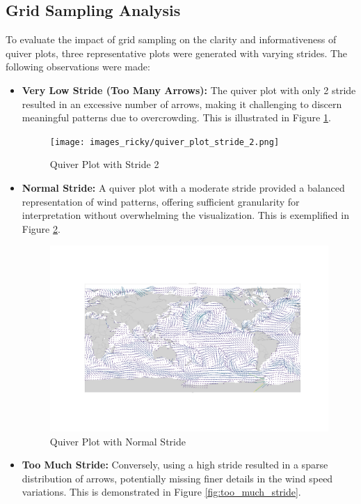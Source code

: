 \documentclass[conference]{IEEEtran}
\begin{document}
\subsection{Grid Sampling Analysis}

To evaluate the impact of grid sampling on the clarity and informativeness of quiver plots, three representative plots were generated with varying strides. The following observations were made:

\begin{itemize}
  \item \textbf{Very Low Stride (Too Many Arrows):} The quiver plot with only 2 stride resulted in an excessive number of arrows, making it challenging to discern meaningful patterns due to overcrowding. This is illustrated in Figure \ref{fig:no_stride}.

  \begin{figure}[h]
    \centering
    \texttt{[image: images\_ricky/quiver\_plot\_stride\_2.png]}
    \caption{Quiver Plot with Stride 2}
    \label{fig:no_stride}
  \end{figure}

  \item \textbf{Normal Stride:} A quiver plot with a moderate stride provided a balanced representation of wind patterns, offering sufficient granularity for interpretation without overwhelming the visualization. This is exemplified in Figure \ref{fig:normal_stride}.

  \begin{figure}[h]
    \centering
    \includegraphics[width=0.7\linewidth]{images_ricky/quiver_plot_stride_7.png}
    \caption{Quiver Plot with Normal Stride}
    \label{fig:normal_stride}
  \end{figure}

  \item \textbf{Too Much Stride:} Conversely, using a high stride resulted in a sparse distribution of arrows, potentially missing finer details in the wind speed variations. This is demonstrated in Figure \ref{fig:too_much_stride}.


\end{itemize}
\end{document}
